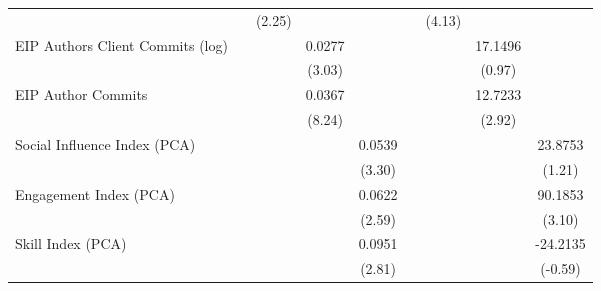 {\begin{tabular}{l*{8}{c}}
                                   &                   &    (2.25)         &                   &                   &                   &    (4.13)         &                   &                   \\
[1em]
EIP Authors Client Commits (log)   &                   &                   &    0.0277\sym{***}&                   &                   &                   &   17.1496         &                   \\
                                   &                   &                   &    (3.03)         &                   &                   &                   &    (0.97)         &                   \\
[1em]
EIP Author Commits                 &                   &                   &    0.0367\sym{***}&                   &                   &                   &   12.7233\sym{***}&                   \\
                                   &                   &                   &    (8.24)         &                   &                   &                   &    (2.92)         &                   \\
[1em]
Social Influence Index (PCA)       &                   &                   &                   &    0.0539\sym{***}&                   &                   &                   &   23.8753         \\
                                   &                   &                   &                   &    (3.30)         &                   &                   &                   &    (1.21)         \\
[1em]
Engagement Index (PCA)             &                   &                   &                   &    0.0622\sym{***}&                   &                   &                   &   90.1853\sym{***}\\
                                   &                   &                   &                   &    (2.59)         &                   &                   &                   &    (3.10)         \\
[1em]
Skill Index (PCA)                  &                   &                   &                   &    0.0951\sym{***}&                   &                   &                   &  -24.2135         \\
                                   &                   &                   &                   &    (2.81)         &                   &                   &                   &   (-0.59)         \\

\end{tabular}}
